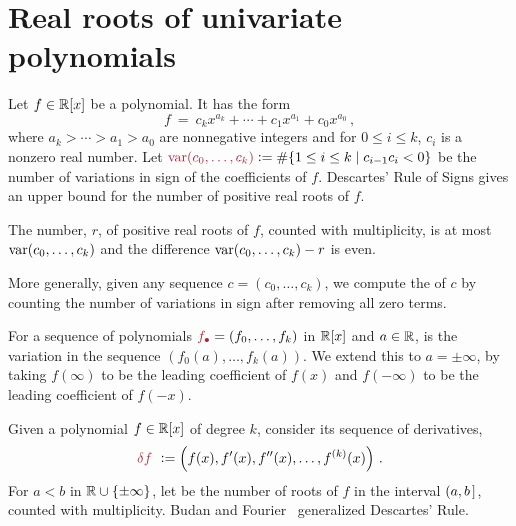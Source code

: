 
\section{Real roots of univariate polynomials}

Let $f\in\mathbb{R}[x]$ be a polynomial.
It has the form
%
 \[
   f\ =\ c_kx^{a_k}  + \dotsb + c_{1}x^{a_{1}} + c_0x^{a_0}\,,
 \]
%
where $a_k> \dotsb > a_1 > a_0$ are nonnegative integers and for $0\leq i \leq k$, $c_{i}$ is a nonzero real number.
Let $\defcolor{\var(c_0,\dotsc,c_k)}\vcentcolon=\#\{1\leq i\leq k\mid c_{i-1}c_i<0\}$ be the number of variations in sign of the
coefficients of $f$.
Descartes' Rule of Signs \cite{So_Book} gives an upper bound for the number of positive real roots of $f$.

\begin{theorem}
  The number, $r$,  of positive real roots of $f$, counted with multiplicity, is at most $\operatorname{{\rm var}}(c_0,\dotsc,c_k)$ and the difference
  $\operatorname{{\rm var}}(c_0,\dotsc,c_k)-r$ is even.
\end{theorem}

More generally, given any sequence $c=(c_0,\dotsc,c_k)$, we compute the    of $c$ by counting the
number of variations in sign after removing all zero terms.
%
\begin{leftbar}

\end{leftbar}
%
For a sequence of polynomials  $\defcolor{f_\bullet}=(f_0,\dotsc,f_k)$ in $\mathbb{R}[x]$ and $a\in\mathbb{R}$,  is the
variation in the sequence 
$(f_0(a),\dotsc,f_{k}(a))$. 
We extend this to $a=\pm\infty$, by taking $f(\infty)$ to be the leading coefficient of $f(x)$ and $f(-\infty)$ to be the leading
coefficient of $f(-x)$.

Given a polynomial $f\in\mathbb{R}[x]$ of degree $k$, consider its sequence of derivatives,
%
 \[
   \defcolor{\delta f}\ \vcentcolon= \left(f(x),f'(x),f''(x),\dots,f^{(k)}(x)\right)\,.
 \]
%
For $a<b$ in $\mathbb{R}\cup\{\pm \infty\}$, let  be the number of roots of $f$ in the interval $(a,b\hspace{.05cm}]$, counted
with multiplicity.
Budan and Fourier~\cite[Ch.\ 2]{So_Book} generalized Descartes' Rule.

